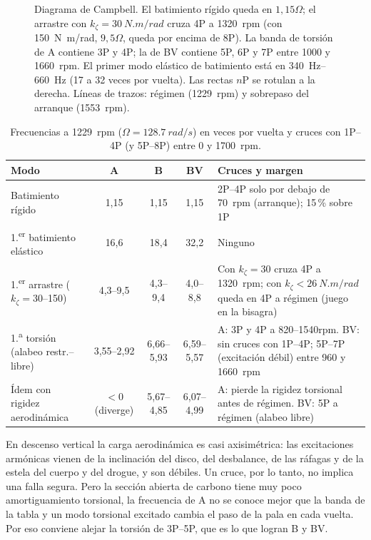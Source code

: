 \begin{figure}[H]
\caption{Diagrama de Campbell. El batimiento rígido queda en $1{,}15\Omega$; el arrastre
con $k_\zeta=\SI{30}{N.m/rad}$ cruza 4P a \SI{1320}{rpm} (con \SI{150}{N.m/rad}, $9{,}5\Omega$,
queda por encima de 8P). La banda de torsión de A contiene 3P y 4P; la de BV contiene 5P, 6P y
7P entre \num{1000} y \SI{1660}{rpm}. El primer modo elástico de batimiento está en
\SIrange{340}{660}{Hz} (17 a 32 veces por vuelta). Las rectas $n$P se rotulan a la
derecha. Líneas de trazos: régimen (\num{1229}~rpm) y sobrepaso del arranque
(\num{1553}~rpm).}
\label{fig:estructura-campbell}
\end{figure}

\begin{table}[H]
\centering\small
\caption{Frecuencias a \SI{1229}{rpm} ($\Omega=\SI{128.7}{rad/s}$) en veces por vuelta y
cruces con 1P--4P (y 5P--8P) entre 0 y \SI{1700}{rpm}.}\label{tab:estructura-frec}
\begin{tabularx}{\textwidth}{@{}lcccY@{}}
\toprule
\textbf{Modo} & \textbf{A} & \textbf{B} & \textbf{BV} & \textbf{Cruces y margen}\\\midrule
Batimiento rígido & 1,15 & 1,15 & 1,15 & 2P--4P solo por debajo de \SI{70}{rpm} (arranque); 15\,\% sobre 1P\\
1.\textsuperscript{er} batimiento elástico & 16,6 & 18,4 & 32,2 & Ninguno\\
1.\textsuperscript{er} arrastre ($k_\zeta=30$--150) & 4,3--9,5 & 4,3--9,4 & 4,0--8,8 & Con $k_\zeta=30$ cruza 4P a \SI{1320}{rpm}; con $k_\zeta<\SI{26}{N.m/rad}$ queda en 4P a régimen (juego en la bisagra)\\
1.\textsuperscript{a} torsión (alabeo restr.--libre) & 3,55--2,92 & 6,66--5,93 & 6,59--5,57 & A: 3P y 4P a \numrange{820}{1540}{rpm}. BV: sin cruces con 1P--4P; 5P--7P (excitación débil) entre \num{960} y \SI{1660}{rpm}\\
Ídem con rigidez aerodinámica & $<0$ (diverge) & 5,67--4,85 & 6,07--4,99 & A: pierde la rigidez torsional antes de régimen. BV: 5P a régimen (alabeo libre)\\
\bottomrule
\end{tabularx}
\end{table}

En descenso vertical la carga aerodinámica es casi axisimétrica: las excitaciones
armónicas vienen de la inclinación del disco, del desbalance, de las ráfagas y de la
estela del cuerpo y del drogue, y son débiles. Un cruce, por lo tanto, no implica una
falla segura. Pero la sección abierta de carbono tiene muy poco amortiguamiento
torsional, la frecuencia de A no se conoce mejor que la banda de la tabla y un modo
torsional excitado cambia el paso de la pala en cada vuelta. Por eso conviene alejar la
torsión de 3P--5P, que es lo que logran B y BV.

